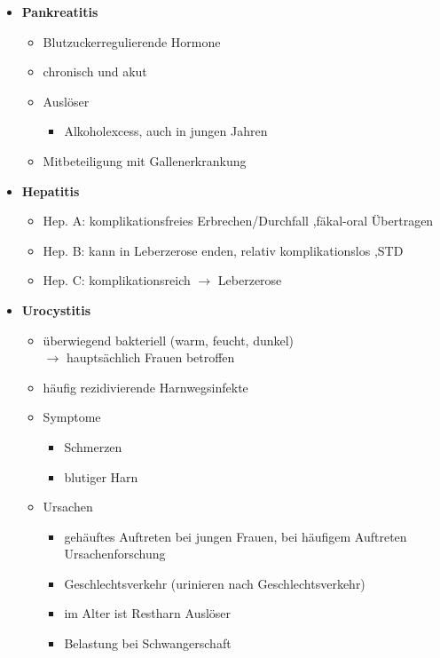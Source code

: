 \begin{itemize}
\begin{itemize}
\begin{itemize}
						\end{itemize}
				\end{itemize}
	\pagebreak
			\item \textbf{Pankreatitis}
				\begin{itemize}
					\item Blutzuckerregulierende Hormone
					\item chronisch und akut
					\item Auslöser
						\begin{itemize}
							\item Alkoholexcess, auch in jungen Jahren
						\end{itemize}
					\item Mitbeteiligung mit Gallenerkrankung
				\end{itemize}
			\item \textbf{Hepatitis}
				\begin{itemize}
					\item Hep. A: komplikationsfreies Erbrechen/Durchfall ,fäkal-oral Übertragen
					\item Hep. B: kann in Leberzerose enden, relativ komplikationslos ,STD
					\item Hep. C: komplikationsreich $\rightarrow$ Leberzerose
				\end{itemize}
			\item \textbf{Urocystitis}
				\begin{itemize}
					\item überwiegend bakteriell (warm, feucht, dunkel)\\
						$\rightarrow$ hauptsächlich Frauen betroffen
					\item häufig rezidivierende Harnwegsinfekte
					\item Symptome
						\begin{itemize}
							\item Schmerzen
							\item blutiger Harn
						\end{itemize}
					\item Ursachen
						\begin{itemize}
							\item gehäuftes Auftreten bei jungen Frauen, bei häufigem Auftreten Ursachenforschung
							\item Geschlechtsverkehr (urinieren nach Geschlechtsverkehr)
							\item im Alter ist Restharn Auslöser
							\item Belastung bei Schwangerschaft

\end{itemize}
\end{itemize}
\end{itemize}
